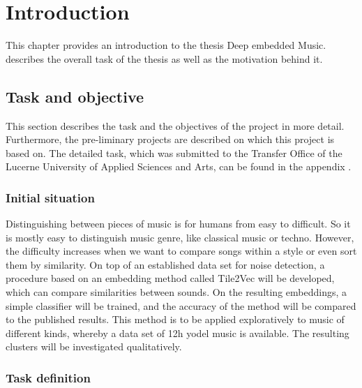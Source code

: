 \chapter{Introduction}
\label{ch:Introduction}

This chapter provides an introduction to the thesis \flqq Deep embedded Music\frqq.  describes the overall task of the thesis as well as the motivation behind it.

\section{Task and objective}
\label{sec:Task-Objective}

This section describes the task and the objectives of the project in more detail. Furthermore, the pre-liminary projects are described on which this project is based on. The detailed task, which was submitted to the Transfer Office of the Lucerne University of Applied Sciences and Arts, can be found in the appendix .

\subsection{Initial situation}
\label{sub:Initial-Stituation}

Distinguishing between pieces of music is for humans from easy to difficult. So it is mostly easy to distinguish music genre, like classical music or techno. However, the difficulty increases when we want to compare songs within a style or even sort them by similarity.
\newline
\newline
On top of an established data set for noise detection, a procedure based on an embedding method called Tile2Vec will be developed, which can compare similarities between sounds. On the resulting embeddings, a simple classifier will be trained, and the accuracy of the method will be compared to the published results.
\newline
\newline
This method is to be applied exploratively to music of different kinds, whereby a data set of 12h yodel music is available. The resulting clusters will be investigated qualitatively.

\subsection{Task definition}
\label{sub:Task-Definition}


